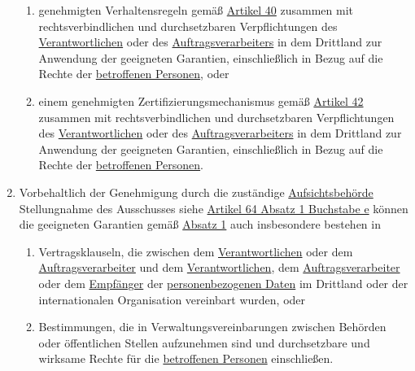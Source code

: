\begin{enumerate}
\begin{enumerate}
    \item genehmigten Verhaltensregeln gemäß \hyperref[ch:40]{Artikel 40} zusammen mit rechtsverbindlichen und
     durchsetzbaren Verpflichtungen des \hyperref[itm:04-7]{Verantwortlichen} oder des \hyperref[itm:04-8]
     {Auftragsverarbeiters} in dem Drittland zur Anwendung der geeigneten Garantien, einschließlich in Bezug auf die Rechte
     der \hyperref[itm:04-1]{betroffenen Personen}, oder%
    \label{itm:46-2e}

    \item einem genehmigten Zertifizierungsmechanismus gemäß \hyperref[ch:42]{Artikel 42} zusammen mit
     rechtsverbindlichen und durchsetzbaren Verpflichtungen des \hyperref[itm:04-7]{Verantwortlichen} oder
     des \hyperref[itm:04-8]{Auftragsverarbeiters} in dem Drittland zur Anwendung der geeigneten Garantien,
     einschließlich in Bezug auf die Rechte der \hyperref[itm:04-1]{betroffenen Personen}.%
    \label{itm:46-2f}

  \end{enumerate}

  \item Vorbehaltlich der Genehmigung durch die zuständige \hyperref[itm:04-21]{Aufsichtsbehörde}\comment
   {Stellungnahme des Ausschusses siehe \hyperref[itm:64-1e]{Artikel 64 Absatz 1 Buchstabe e}} können die geeigneten
   Garantien gemäß \hyperref[itm:46-1]{Absatz 1} auch insbesondere bestehen in%
  \label{itm:46-3}

  \begin{enumerate}
  
    \item Vertragsklauseln, die zwischen dem \hyperref[itm:04-7]{Verantwortlichen} oder dem \hyperref[itm:04-8]
     {Auftragsverarbeiter} und dem \hyperref[itm:04-7]{Verantwortlichen}, dem
     \hyperref[itm:04-8]{Auftragsverarbeiter} oder dem \hyperref[itm:04-9]{Empfänger} der \hyperref[itm:04-1]
      {personenbezogenen Daten} im Drittland oder der internationalen Organisation vereinbart wurden, oder%
    \label{itm:46-3a}

    \item Bestimmungen, die in Verwaltungsvereinbarungen zwischen Behörden oder öffentlichen Stellen aufzunehmen sind
     und durchsetzbare und wirksame Rechte für die \hyperref[itm:04-1]{betroffenen Personen} einschließen.%
    \label{itm:46-3b}

  \end{enumerate}


\end{enumerate}
